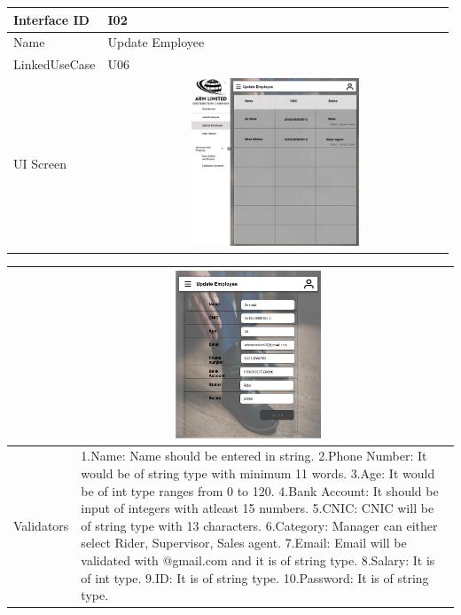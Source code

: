 \documentclass[12pt]{article}
\begin{document}
\begin{table}[H] 
\begin{tabular} {|m{6em}|m{12cm}|}
\hline
Interface ID & I02 \\ \hline
\newline
Name & Update Employee \\ \hline
LinkedUseCase & U06 \\ \hline
UI Screen &\newline \includegraphics [width=10cm, height=5cm] {2a.png} \\ \hline
\end{tabular}
\end{table}
\begin{table}[H] 
\begin{tabular} {|m{6em}|m{12cm}|}
\hline
     & \newline\newline\includegraphics [width=10cm, height=5cm] {3a.png}
     \\ \hline
\newline
Validators &  1.Name: Name should be entered in string.
\newline
2.Phone Number: It would be of string type with minimum 11 words.
\newline
3.Age: It would be of int type ranges from 0 to 120.
\newline
4.Bank Account: It should be input of integers with atleast 15 numbers.
\newline
5.CNIC: CNIC will be of string type with 13 characters.
\newline
6.Category: Manager can either select Rider, Supervisor, Sales agent.
\newline
7.Email: Email will be validated with @gmail.com and it is of string type.
\newline
8.Salary: It is of int type.
\newline
9.ID: It is of string type.
\newline
10.Password: It is of string type.
\newline
\\ \hline
\end{tabular}
\end{table}
\end{document}
